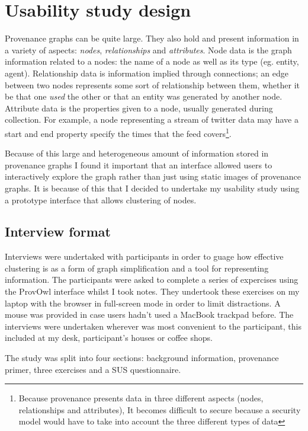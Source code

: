 \chapter{Usability study design}

Provenance graphs can be quite large. They also hold and present information in a variety of aspects: \textit{nodes}, \textit{relationships} and \textit{attributes}. Node data is the graph information related to a nodes: the name of a node as well as its type (eg. entity, agent). Relationship data is information implied through connections; an edge between two nodes represents some sort of relationship between them, whether it be that one \textit{used} the other or that an entity was generated by another node. Attribute data is the properties given to a node, usually generated during collection. For example, a node representing a stream of twitter data may have a start and end property specify the times that the feed covers\footnote{Because provenance presents data in three different aspects (nodes, relationships and attributes), It becomes difficult to secure because a security model would have to take into account the three different types of data\cite{Braun2008}}.

Because of this large and heterogeneous amount of information stored in provenance graphs I found it important that an interface allowed users to interactively explore the graph rather than just using static images of provenance graphs. It is because of this that I decided to undertake my usability study using a prototype interface that allows clustering of nodes. 

\section{Interview format}
\label{sec:interview_format}

Interviews were undertaked with participants in order to guage how effective clustering is as a form of graph simplification and a tool for representing information. The participants were asked to complete a series of expercises using the ProvOwl interface whilst I took notes. They undertook these exercises on my laptop with the browser in full-screen mode in order to limit distractions. A mouse was provided in case users hadn't used a MacBook trackpad before. The interviews were undertaken wherever was most convenient to the participant, this included at my desk, participant's houses or coffee shops.

The study was split into four sections: background information, provenance primer, three exercises and a SUS questionnaire. 

